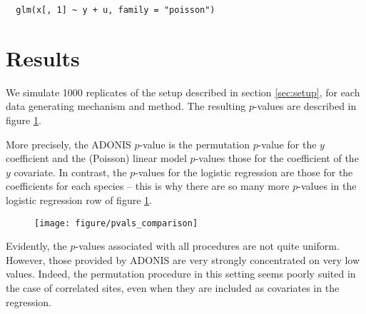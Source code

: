 \documentclass{article}
\newenvironment{code}{\captionsetup{type=listing}}{}
\begin{document}
\begin{code}
\begin{verbatim}
  glm(x[, 1] ~ y + u, family = "poisson")
\end{verbatim}
\end{code}

\section{Results}
\label{sec:results}

We simulate 1000 replicates of the setup described in section \ref{sec:setup},
for each data generating mechanism and method. The resulting $p$-values are
described in figure \ref{fig:pvals_comparison}. 

More precisely, the ADONIS $p$-value is the permutation $p$-value for the $y$
coefficient and the (Poisson) linear model $p$-values those for the coefficient
of the $y$ covariate. In contrast, the $p$-values for the logistic regression
are those for the coefficients for each species -- this is why there are so many
more $p$-values in the logistic regression row of figure
\ref{fig:pvals_comparison}.

\begin{figure}
  \centering
  \texttt{[image: figure/pvals\_comparison]}
  \caption{\label{fig:pvals_comparison} }
\end{figure}

Evidently, the $p$-values associated with all procedures are not quite uniform.
However, those provided by ADONIS are very strongly concentrated on very low
values. Indeed, the permutation procedure in this setting seems poorly suited in
the case of correlated sites, even when they are included as covariates in the
regression.



\end{document}
